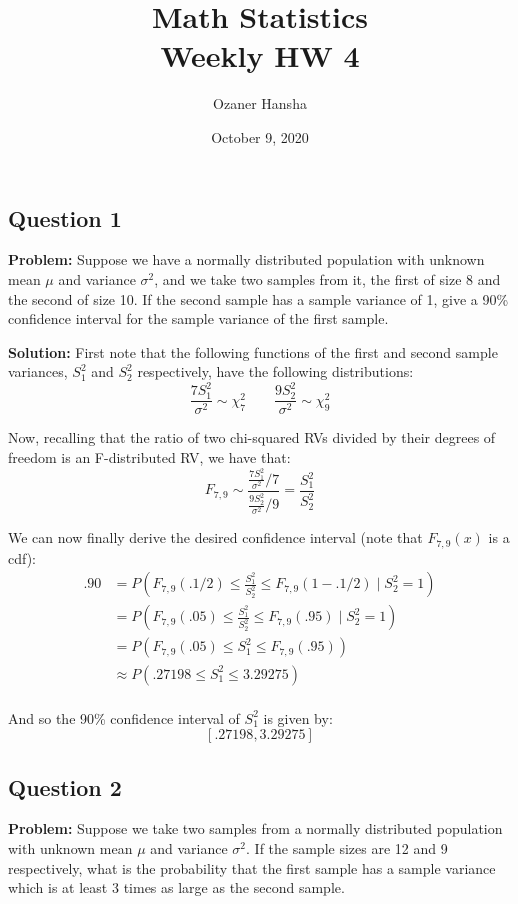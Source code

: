 \documentclass{article}
\begin{document}
\title{Math Statistics\\ Weekly HW 4}
\author{Ozaner Hansha}
\date{October 9, 2020}
\maketitle

\subsection*{Question 1}
\noindent\textbf{Problem:} Suppose we have a normally distributed population with unknown mean $\mu$ and variance $\sigma^2$, and we take two samples from it, the first of size 8 and the second of size 10. If the second sample has a sample variance of 1, give a 90\% confidence interval for the sample variance of the first sample.
\bigskip

\noindent\textbf{Solution:} First note that the following functions of the first and second sample variances, $S_1^2$ and $S_2^2$ respectively, have the following distributions:
$$\frac{7S^2_1}{\sigma^2}\sim\chi^2_7\qquad\frac{9S^2_2}{\sigma^2}\sim\chi^2_9$$

Now, recalling that the ratio of two chi-squared RVs divided by their degrees of freedom is an F-distributed RV, we have that:
$$F_{7,9}\sim\frac{\frac{7S^2_1}{\sigma^2}/7}{\frac{9S^2_2}{\sigma^2}/9}=\frac{S^2_1}{S^2_2}$$

We can now finally derive the desired confidence interval (note that $F_{7,9}(x)$ is a cdf):
\begin{align*}
  .90&=P\left(F_{7,9}(.1/2)\le\frac{S^2_1}{S^2_2}\le F_{7,9}(1-.1/2)\mid S_2^2=1\right)\\
  &=P\left(F_{7,9}(.05)\le\frac{S^2_1}{S^2_2}\le F_{7,9}(.95)\mid S_2^2=1\right)\\
  &=P\left(F_{7,9}(.05)\le S^2_1\le F_{7,9}(.95)\right)\\
  &\approx P\left(.27198\le S^2_1\le 3.29275\right)\\
\end{align*}

And so the 90\% confidence interval of $S^2_1$ is given by:
$$[.27198,3.29275]$$

\subsection*{Question 2}
\noindent\textbf{Problem:} Suppose we take two samples from a normally distributed population with unknown mean $\mu$ and variance $\sigma^2$. If the sample sizes are 12 and 9 respectively, what is the probability that the first sample has a sample variance which is at least 3 times as large as the second sample.
\bigskip
\end{document}
